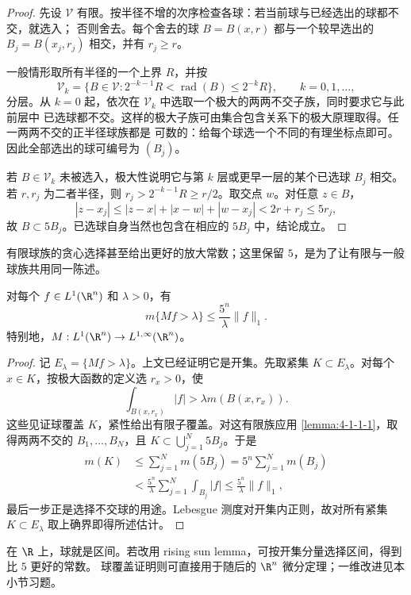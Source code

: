 \begin{proof}
先设 $\mathcal V$ 有限。按半径不增的次序检查各球：若当前球与已经选出的球都不交，就选入；
否则舍去。每个舍去的球 $B=B(x,r)$ 都与一个较早选出的
$B_j=B(x_j,r_j)$ 相交，并有 $r_j\ge r$。

一般情形取所有半径的一个上界 $R$，并按
\[
 \mathcal V_k=\{B\in\mathcal V:2^{-k-1}R<\operatorname{rad}(B)\le2^{-k}R\},
 \qquad k=0,1,\ldots,
\]
分层。从 $k=0$ 起，依次在 $\mathcal V_k$ 中选取一个极大的两两不交子族，同时要求它与此前层中
已选球都不交。这样的极大子族可由集合包含关系下的极大原理取得。任一两两不交的正半径球族都是
可数的：给每个球选一个不同的有理坐标点即可。因此全部选出的球可编号为 $(B_j)$。

若 $B\in\mathcal V_k$ 未被选入，极大性说明它与第 $k$ 层或更早一层的某个已选球 $B_j$ 相交。
若 $r,r_j$ 为二者半径，则 $r_j>2^{-k-1}R\ge r/2$。取交点 $w$。对任意 $z\in B$，
\[
 |z-x_j|\le |z-x|+|x-w|+|w-x_j|<2r+r_j\le5r_j,
\]
故 $B\subset5B_j$。已选球自身当然也包含在相应的 $5B_j$ 中，结论成立。
\end{proof}

有限球族的贪心选择甚至给出更好的放大常数；这里保留 $5$，是为了让有限与一般球族共用同一陈述。

\begin{theorem}\label{theorem:4-1-1-2}
对每个 $f\in L^1(\R^n)$ 和 $\lambda>0$，有
\[
 m\{Mf>\lambda\}\le \frac{5^n}{\lambda}\|f\|_1.
\]
特别地，$M:L^1(\R^n)\to L^{1,\infty}(\R^n)$。
\end{theorem}

\begin{proof}
记 $E_\lambda=\{Mf>\lambda\}$。上文已经证明它是开集。先取紧集
$K\subset E_\lambda$。对每个 $x\in K$，按极大函数的定义选 $r_x>0$，使
\[
  \int_{B(x,r_x)}|f|>\lambda m(B(x,r_x)).
\]
这些见证球覆盖 $K$，紧性给出有限子覆盖。对这有限族应用
\cref{lemma:4-1-1-1}，取得两两不交的 $B_1,\ldots,B_N$，且
$K\subset\bigcup_{j=1}^N5B_j$。于是
\[
 \begin{aligned}
 m(K)&\le\sum_{j=1}^N m(5B_j)
      =5^n\sum_{j=1}^Nm(B_j)\\
 &<\frac{5^n}{\lambda}\sum_{j=1}^N\int_{B_j}|f|
 \le\frac{5^n}{\lambda}\|f\|_1,
 \end{aligned}
\]
最后一步正是选择不交球的用途。Lebesgue 测度对开集内正则，故对所有紧集
$K\subset E_\lambda$ 取上确界即得所述估计。
\end{proof}

\begin{remark}[一维覆盖常数的改进]\label{ex:4-1-1-3}
在 $\R$ 上，球就是区间。若改用 rising sun lemma，可按开集分量选择区间，得到比 $5$ 更好的常数。
球覆盖证明则可直接用于随后的 $\R^n$ 微分定理；一维改进见本小节习题。
\end{remark}

